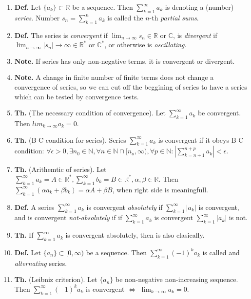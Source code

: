 \documentclass{article}
\newcommand{\<}{\left<}
\renewcommand{\>}{\right>}
\newcommand{\N}{\mathbb{N}}
\newcommand{\R}{\mathbb{R}}
\newcommand{\C}{\mathbb{C}}
\newcommand{\define}{\textbf{Def. }}
\newcommand{\theor}{\textbf{Th. }}
\newcommand{\note}{\textbf{Note. }}
\begin{document}
\begin{multicols}{3}
\begin{enumerate}[itemsep=2pt, topsep=2pt, partopsep=2pt, parsep=2pt]
        \item \define Let $\{a_k\}\subset\R$ be a sequence. Then $\sum_{k=1}^\infty a_k$ is denoting a (number) \emph{series}. Number $s_n=\sum_{k=1}^n a_k$ is called the $n$-th \emph{partial sums}.
        \item \define The series is \emph{convergent} if $\lim_{n\to\infty}s_n\in\R$ or $\C$, is \emph{divergent} if $\lim_{n\to\infty}|s_n|\to\infty\in\R^*$ or $\C^*$, or otherwise is \emph{oscillating}.
        \item \note If series has only non-negative terms, it is convergent or divergent.
        \item \note A change in finite number of finite terms does not change a convergence of series, so we can cut off the beggining of series to have a series which can be tested by convergence tests.
        \item \theor (The necessary condition of convergence). Let $\sum_{k=1}^\infty a_k$ be convergent. Then $lim_{k\to\infty}a_k=0$.
        \item \theor (B-C condition for series). Series $\sum_{k=1}^\infty a_k$ is convergent if it obeys B-C condition: $\forall\epsilon>0,\exists n_0\in\N,\forall n\in\N\cap[n_o,\infty),\forall p\in\N:|\sum_{k=n+1}^{n+p}a_k|<\epsilon$.
        \item \theor (Arithemtic of series). Let $\sum_{k=1}^\infty a_k=A\in\R^*,\sum_{k=1}^\infty b_k=B\in\R^*,\alpha,\beta\in\R$. Then $\sum_{k=1}^\infty(\alpha a_k+\beta b_k)=\alpha A+\beta B$, when right side is meaningfull.
        \item \define A series $\sum_{k=1}^\infty a_k$ is convergent \emph{absolutely} if $\sum_{k=1}^\infty |a_k|$ is convergent, and is convergent \emph{not-absolutely} if  if $\sum_{k=1}^\infty a_k$ is convergent $\sum_{k=1}^\infty |a_k|$ is not.
        \item \theor If $\sum_{k=1}^\infty a_k$ is convergent absolutely, then is also clasically.
        \item \define Let $\{a_n\}\subset[0,\infty)$ be a sequence. Then $\sum_{k=1}^\infty(-1)^ka_k$ is called and \emph{alternating} series.
        \item \theor (Leibniz criterion). Let $\{a_n\}$ be non-negative non-increasing sequence. Then $\sum_{k=1}^\infty(-1)^ka_k$ is convergent $\Longleftrightarrow$ $\lim_{k\to\infty}a_k=0$.


\end{enumerate}
\end{multicols}
\end{document}
